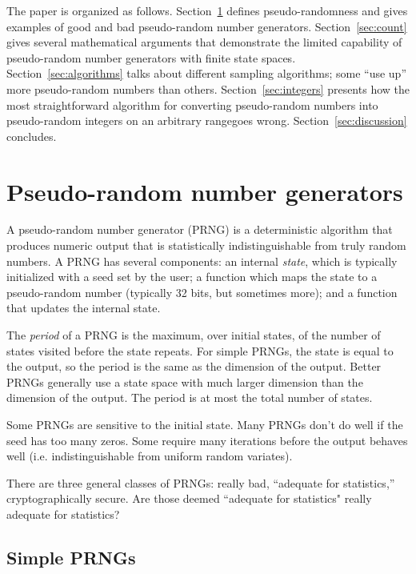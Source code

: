 \documentclass[graybox]{svmult}
\begin{document}
The paper is organized as follows.
Section~\ref{sec:prngs} defines pseudo-randomness and gives examples of good and bad pseudo-random number generators.
Section~\ref{sec:count} gives several mathematical arguments that demonstrate the limited capability of pseudo-random number
generators with finite state spaces.
Section~\ref{sec:algorithms} talks about different sampling algorithms; some ``use up'' more pseudo-random numbers than others.
Section~\ref{sec:integers} presents how the most straightforward algorithm for converting pseudo-random numbers into pseudo-random integers on an arbitrary
rangegoes wrong.
Section~\ref{sec:discussion} concludes.



\section{Pseudo-random number generators}
\label{sec:prngs}

A pseudo-random number generator (PRNG) is a deterministic algorithm that produces numeric output that is statistically indistinguishable
from truly random numbers.
A PRNG has several components:
an internal \emph{state}, which is typically initialized with a seed set by the user;
a function which maps the state to a pseudo-random number (typically 32 bits, but sometimes more);
and a function that updates the internal state.


The \emph{period} of a PRNG is the maximum, over initial states, of the number of states visited before the state repeats.
For simple PRNGs, the state is equal to the output, so the period is the same as the dimension of the output.
Better PRNGs generally use a state space with much larger dimension than the dimension of the output.
The period is at most the total number of states.

Some PRNGs are sensitive to the initial state.
Many PRNGs don't do well if the seed has too many zeros.
Some require many iterations before the output behaves well (i.e. indistinguishable from uniform random variates).

There are three general classes of PRNGs: really bad, ``adequate for statistics,'' cryptographically secure.
Are those deemed ``adequate for statistics" really adequate for statistics?

\subsection{Simple PRNGs}
\end{document}
